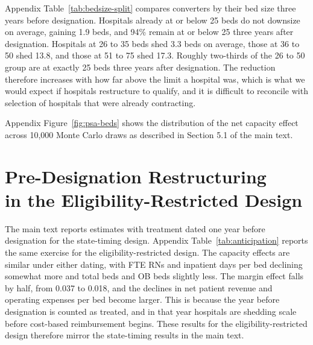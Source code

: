 \documentclass[a4paper, 12pt]{article}
\begin{document}
Appendix Table~\ref{tab:bedsize-split} compares converters by their bed size three years before designation. Hospitals already at or below 25 beds do not downsize on average, gaining 1.9 beds, and 94\% remain at or below 25 three years after designation. Hospitals at 26 to 35 beds shed 3.3 beds on average, those at 36 to 50 shed 13.8, and those at 51 to 75 shed 17.3. Roughly two-thirds of the 26 to 50 group are at exactly 25 beds three years after designation. The reduction therefore increases with how far above the limit a hospital was, which is what we would expect if hospitals restructure to qualify, and it is difficult to reconcile with selection of hospitals that were already contracting.

Appendix Figure~\ref{fig:psa-beds} shows the distribution of the net capacity effect across 10,000 Monte Carlo draws as described in Section 5.1 of the main text.



\section[Pre-Designation Restructuring in the Eligibility-Restricted Design]{Pre-Designation Restructuring \\ in the Eligibility-Restricted Design}
\label{sec:app-anticipation}

The main text reports estimates with treatment dated one year before designation for the state-timing design. Appendix Table~\ref{tab:anticipation} reports the same exercise for the eligibility-restricted design. The capacity effects are similar under either dating, with FTE RNs and inpatient days per bed declining somewhat more and total beds and OB beds slightly less. The margin effect falls by half, from 0.037 to 0.018, and the declines in net patient revenue and operating expenses per bed become larger. This is because the year before designation is counted as treated, and in that year hospitals are shedding scale before cost-based reimbursement begins. These results for the eligibility-restricted design therefore mirror the state-timing results in the main text.


\end{document}
